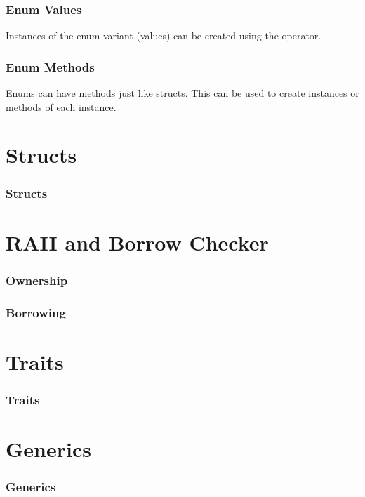 \documentclass{beamer}
\begin{document}
\begin{frame}[fragile]
  \frametitle{Enum Values}
  Instances of the enum variant (values) can be created using the \inlinecode{::} operator.

  
\end{frame}

\begin{frame}[fragile]
  \frametitle{Enum Methods}
  Enums can have methods just like structs. This can be used to create instances or methods of each instance.

  
\end{frame}

\section{Structs}
\begin{frame}
  \frametitle{Structs}

\end{frame}

\section{RAII and Borrow Checker}
\begin{frame}
  \frametitle{Ownership}

\end{frame}

\begin{frame}
  \frametitle{Borrowing}

\end{frame}

\section{Traits}
\begin{frame}
  \frametitle{Traits}

\end{frame}

\section{Generics}
\begin{frame}
  \frametitle{Generics}

\end{frame}

\appendix
\end{document}
